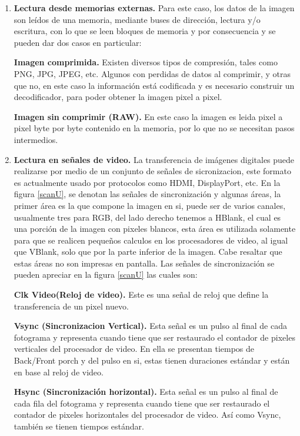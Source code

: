 \documentclass[twoside,spanish,ESP,MSc]{plantillaLabUPV}
\theoremstyle{definition}
\begin{document}
\begin{enumerate}
 \item \textbf{Lectura desde memorias externas.}
 Para este caso, los datos de la imagen son leídos de una memoria, mediante buses de dirección, lectura y/o escritura, con lo que se leen bloques de memoria y por consecuencia  y se pueden dar dos casos en particular:
 
 \checkmark\textbf{Imagen comprimida.} Existen diversos tipos de compresión, tales como PNG, JPG, JPEG, etc. Algunos con perdidas de datos al comprimir, y otras  que no, en este caso la información está codificada y es necesario construir un decodificador, para poder obtener la imagen pixel a pixel. 
 
 \checkmark\textbf{Imagen sin comprimir (RAW).} En este caso la imagen es leida pixel a pixel byte por byte contenido en la memoria, por lo que no se necesitan pasos intermedios.
 
 
 \item \textbf{Lectura en señales de video.} 
 La transferencia de imágenes digitales puede realizarse por medio de un conjunto de señales de sicronizacion, este formato es actualmente usado por protocolos como HDMI, DisplayPort, etc. En la figura \ref{scanU}, se denotan las señales de sincronización y algunas áreas, la primer área es la que compone la imagen en si, puede ser de varios canales, usualmente tres para RGB, del lado derecho tenemos a HBlank, el cual es una porción de la imagen con pixeles blancos, esta área es utilizada solamente para que se realicen pequeños calculos en los procesadores de video, al igual que VBlank, solo que por la parte inferior de la imagen. Cabe resaltar que estas áreas no son impresas en pantalla. Las señales de sincronización se pueden apreciar en la figura \ref{scanU} las cuales son: 
 
  \checkmark\textbf{Clk Video(Reloj de video).} Este es una señal de reloj que define la transferencia de un pixel nuevo.
 
 \checkmark\textbf{Vsync (Sincronizacion Vertical).} Esta señal es un pulso al final de cada fotograma y representa cuando tiene que ser restaurado el contador de pixeles verticales del procesador de video. En ella se presentan tiempos de Back/Front porch y del pulso en si, estas tienen duraciones estándar y están en base al reloj de video.
 
 \checkmark\textbf{Hsync (Sincronización horizontal).} Esta señal es un pulso al final de cada fila del fotograma y representa cuando tiene que ser restaurado el contador de pixeles horizontales del procesador de video. Así como Vsync, también se tienen tiempos estándar.
  

\end{enumerate}
\end{document}
